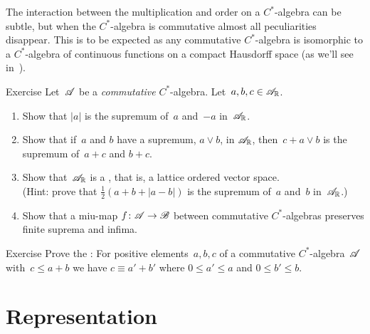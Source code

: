 \documentclass[a]{subfiles}
\begin{document}
\begin{parsec}%
\begin{point}%
The interaction between the multiplication and order
on a $C^*$-algebra can be subtle,
but
when the $C^*$-algebra is commutative
almost all peculiarities disappear.
This is to be expected
as any commutative $C^*$-algebra
is isomorphic to a $C^*$-algebra
of continuous functions on a compact Hausdorff space
(as we'll see in~).
\end{point}
\begin{point}{Exercise}%
Let~$\mathscr{A}$ be a \emph{commutative} $C^*$-algebra.
Let~$a,b,c\in\mathscr{A}_{\mathbb{R}}$.
\begin{enumerate}
\item
Show that $\left| a\right|$ is the supremum of~$a$ and~$-a$
in~$\mathscr{A}_{\mathbb{R}}$.
\item
Show that if~$a$ and $b$ have a supremum, $a\vee b$, in $\mathscr{A}_{\mathbb{R}}$,
then~$c+a\vee b$ is the supremum of~$a+c$ and $b+c$.
\item
Show that~$\mathscr{A}_{\mathbb{R}}$ is a ,
that is,  a lattice ordered vector space.\\
(Hint: prove that $\frac{1}{2}(a+b+\left|a-b\right|)$
is the supremum of~$a$ and~$b$ in~$\mathscr{A}_{\mathbb{R}}$.)
\item
Show that a miu-map $f\colon \mathscr{A}\to\mathscr{B}$
between commutative $C^*$-algebras
preserves finite suprema and infima.
\end{enumerate}
\end{point}
\begin{point}{Exercise}%
Prove the :%
For positive elements~$a,b,c$ of a commutative $C^*$-algebra~$\mathscr{A}$
with~$c\leq a+b$
we have $c\equiv a'+b'$
where  $0\leq a'\leq a$ and $0\leq b'\leq b$.
\end{point}
\end{parsec}
\section{Representation}
\end{document}
